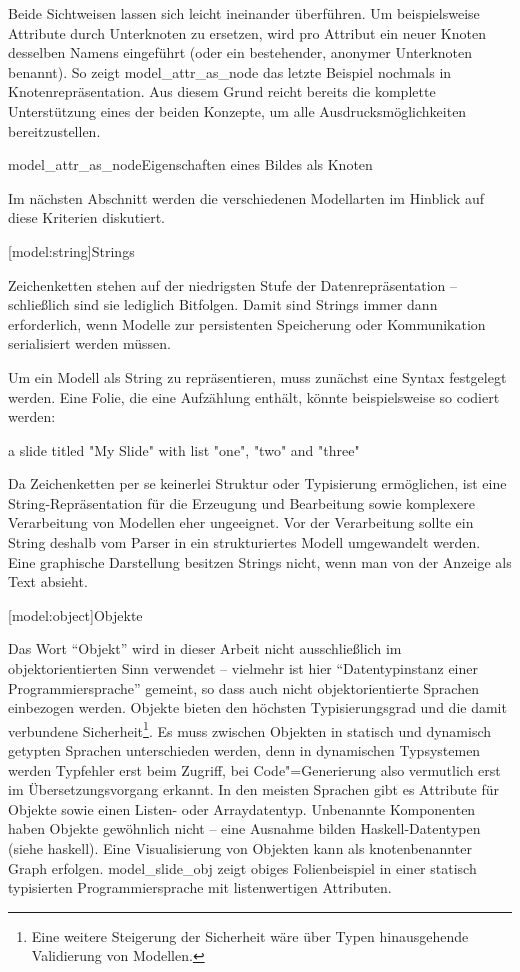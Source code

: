 \documentclass[12pt, a4paper, bibgerm]{scrbook}
\newenvironment{DIFnomarkup}{}{}
\newcommand\lsection{}
\newcommand\sref{}
\newcommand\abb{}
\newcommand\fig{}
\newcommand{\sees}[1]{(siehe \sref{#1})}
\newcommand{\cgen}{Code"=Generierung}
\begin{document}
Beide Sichtweisen lassen sich leicht ineinander überführen. Um
beispielsweise Attribute durch Unterknoten zu ersetzen, wird pro
Attribut ein neuer Knoten desselben Namens eingeführt (oder ein
bestehender, anonymer Unterknoten benannt). So zeigt
\abb{model_attr_as_node} das letzte Beispiel nochmals in
Knotenrepräsentation. Aus diesem Grund reicht bereits die komplette
Unterstützung eines der beiden Konzepte, um alle Ausdrucksmöglichkeiten
bereitzustellen.

\fig{model_attr_as_node}{Eigenschaften eines Bildes als Knoten}

\medskip{}

Im nächsten Abschnitt werden die verschiedenen Modellarten im Hinblick
auf diese Kriterien diskutiert.

\lsection[model:string]{Strings}

Zeichenketten stehen auf der niedrigsten Stufe der Datenrepräsentation --
schließlich sind sie lediglich Bitfolgen. Damit sind Strings immer dann
erforderlich, wenn Modelle zur persistenten Speicherung oder
Kommunikation serialisiert werden müssen.

Um ein Modell als String zu repräsentieren, muss zunächst eine Syntax
festgelegt werden. Eine Folie, die eine Aufzählung enthält, könnte
beispielsweise so codiert werden:
\begin{DIFnomarkup}\begin{code}
a slide titled "My Slide" with list "one", "two" and "three"  
\end{code}\end{DIFnomarkup}

Da Zeichenketten per se keinerlei Struktur oder Typisierung ermöglichen, ist
eine String-Repräsentation für die Erzeugung und Bearbeitung sowie
komplexere Verarbeitung von Modellen eher ungeeignet. Vor der
Verarbeitung sollte ein String deshalb vom Parser in ein strukturiertes
Modell umgewandelt werden. Eine graphische Darstellung besitzen Strings
nicht, wenn man von der Anzeige als Text absieht.

\lsection[model:object]{Objekte}

Das Wort "`Objekt"' wird in dieser Arbeit nicht ausschließlich im
objektorientierten Sinn verwendet -- vielmehr ist hier "`Datentypinstanz
einer Programmiersprache"' gemeint, so dass auch nicht objektorientierte
Sprachen einbezogen werden. Objekte bieten den höchsten Typisierungsgrad
und die damit verbundene Sicherheit\footnote{Eine weitere Steigerung der
  Sicherheit wäre über Typen hinausgehende Validierung von
  Modellen.}. Es muss zwischen Objekten in statisch und dynamisch
getypten Sprachen unterschieden werden, denn in dynamischen Typsystemen
werden Typfehler erst beim Zugriff, bei \cgen{} also vermutlich erst im
Übersetzungsvorgang erkannt. In den meisten Sprachen gibt es Attribute
für Objekte sowie einen Listen- oder Arraydatentyp. Unbenannte
Komponenten haben Objekte gewöhnlich nicht -- eine Ausnahme bilden
Haskell-Datentypen \sees{haskell}. Eine Visualisierung von Objekten kann
als knotenbenannter Graph erfolgen. \abb{model_slide_obj} zeigt
obiges Folienbeispiel in einer statisch typisierten Programmiersprache
mit listenwertigen Attributen.
\end{document}
